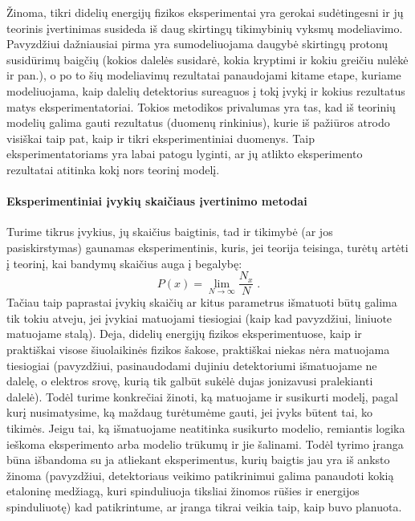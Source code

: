 \documentclass[a4paper, 12pt]{article}
\newlength\q
\begin{document}
Žinoma, tikri didelių energijų fizikos eksperimentai yra gerokai sudėtingesni ir jų teorinis įvertinimas susideda iš daug skirtingų tikimybinių vyksmų modeliavimo. Pavyzdžiui dažniausiai pirma yra sumodeliuojama daugybė skirtingų protonų susidūrimų baigčių (kokios dalelės susidarė, kokia kryptimi ir kokiu greičiu nulėkė ir pan.), o po to šių modeliavimų rezultatai panaudojami kitame etape, kuriame modeliuojama, kaip dalelių detektorius sureaguos į tokį įvykį ir kokius rezultatus matys eksperimentatoriai. Tokios metodikos privalumas yra tas, kad iš teorinių modelių galima gauti rezultatus (duomenų rinkinius), kurie iš pažiūros atrodo visiškai taip pat, kaip ir tikri eksperimentiniai duomenys. Taip eksperimentatoriams yra labai patogu lyginti, ar jų atlikto eksperimento rezultatai atitinka kokį nors teorinį modelį.

\paragraph{Eksperimentiniai įvykių skaičiaus įvertinimo metodai\\}

Turime tikrus įvykius, jų skaičius baigtinis, tad ir tikimybė (ar jos pasiskirstymas) gaunamas eksperimentinis, kuris, jei teorija teisinga, turėtų artėti į teorinį, kai bandymų skaičius auga į begalybę:
\begin{equation}
P(x)=\lim_{N\rightarrow \infty} \frac{N_{x}}{N} \; .
\label{eq:probLim}
\end{equation}
Tačiau taip paprastai įvykių skaičių ar kitus parametrus išmatuoti būtų galima tik tokiu atveju, jei įvykiai matuojami tiesiogiai (kaip kad pavyzdžiui, liniuote matuojame stalą). Deja, didelių energijų fizikos eksperimentuose, kaip ir praktiškai visose šiuolaikinės fizikos šakose, praktiškai niekas nėra matuojama tiesiogiai (pavyzdžiui, pasinaudodami dujiniu detektoriumi išmatuojame ne dalelę, o elektros srovę, kurią tik galbūt sukėlė dujas jonizavusi pralekianti dalelė). Todėl turime konkrečiai žinoti, ką matuojame ir susikurti modelį, pagal kurį nusimatysime, ką maždaug turėtumėme gauti, jei įvyks būtent tai, ko tikimės. Jeigu tai, ką išmatuojame neatitinka susikurto modelio, remiantis logika ieškoma eksperimento arba modelio trūkumų ir jie šalinami. Todėl tyrimo įranga būna išbandoma su ja atliekant eksperimentus, kurių baigtis jau yra iš anksto žinoma (pavyzdžiui, detektoriaus veikimo patikrinimui galima panaudoti kokią etaloninę medžiagą, kuri spinduliuoja tiksliai žinomos rūšies ir energijos spinduliuotę) kad patikrintume, ar įranga tikrai veikia taip, kaip buvo planuota.
\end{document}

